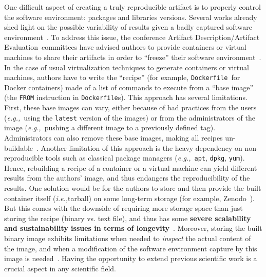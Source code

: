 \documentclass[sigconf,natbib=false]{acmart}
\newcommand{\ie}{\emph{i.e.,}}
\newcommand{\eg}{\emph{e.g.,}}
\newcommand{\ad}{Artifact Description}
\newcommand{\aeval}{Artifact Evaluation}
\newcommand{\adae}{\ad/\aeval}
\newcommand{\df}{\texttt{Dockerfile}}
\newcommand{\todo}[1]{{\color{red}{TODO: #1}}}
\newcommand{\fmc}[1]{{\color{magenta}#1}} %
\begin{document}
One difficult aspect of creating a truly reproducible artifact is to properly control the software environment: packages and libraries versions.
Several works already shed light on the possible variability of results given a badly captured software environment~\cite{mytkowicz_producing_nodate, sokolowski2024impact}.
To address this issue, the conference \adae\ committees have advised authors to provide containers or virtual machines to share their artifacts in order to ``freeze'' their software environment~\cite{eurosys25, aetips, csartifacts}.
In the case of usual virtualization techniques to generate containers or virtual machines, authors have to write the ``recipe'' (for example, \df\ for Docker containers) made of a list of commands to execute from a ``base image'' (the \texttt{FROM} instruction in \df s).
This approach has several limitations.
First, these base images can vary, either because of bad practices from the users (\eg\ using the \texttt{latest} version of the images) or from the administrators of the image (\eg\ pushing a different image to a previously defined tag).
Administrators can also remove these base images, making all recipes un-buildable~\cite{nvidia_cuda_lifetime}.
Another limitation of this approach is the heavy dependency on non-reproducible tools such as classical package managers (\eg\ \texttt{apt}, \texttt{dpkg}, \texttt{yum}).
Hence, rebuilding a recipe of a container or a virtual machine can yield different results from the authors' image, and thus \fmc{endangers} the reproducibility of the results.
One solution would be for the authors to store and then provide the built container itself (\ie tarball) on some long-term storage (for example, Zenodo~\cite{zenodo}).
But this comes with the downside of requiring more storage space than just storing the recipe (binary vs. text file), and thus has some \textbf{severe scalability and sustainability issues in terms of longevity}~\cite{monroe2023preservation, guilloteau2024longevity}.
Moreover, storing the built binary image exhibits limitations when needed to \emph{inspect} the actual content of the image, and when a modification of the software environment capture by this image is needed~\cite{mercier2018considering}.
Having the opportunity to extend previous scientific work is a crucial aspect in any scientific field.


\end{document}
